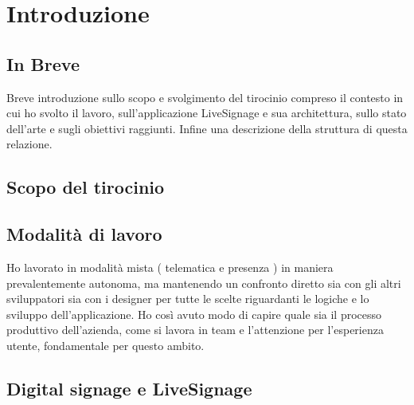 \chapter{Introduzione} 
\linespread{1.5}

\section{In Breve}
Breve introduzione sullo scopo e svolgimento del tirocinio compreso il contesto in cui ho svolto il lavoro, sull'applicazione LiveSignage e sua architettura, sullo stato dell'arte e sugli obiettivi raggiunti. Infine una descrizione della struttura di questa relazione.

\section{Scopo del tirocinio}


\section{Modalità di lavoro}

Ho lavorato in modalità mista ( telematica e presenza ) in maniera prevalentemente autonoma, ma mantenendo un confronto diretto sia con gli altri sviluppatori sia con i designer per tutte le scelte riguardanti le logiche e lo sviluppo dell'applicazione. Ho così avuto modo di capire quale sia il processo produttivo dell'azienda, come si lavora in team e l'attenzione per l'esperienza utente, fondamentale per questo ambito.

\section{Digital signage e LiveSignage}


